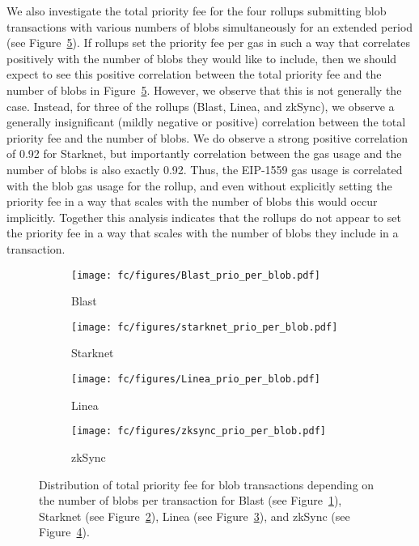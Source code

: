 We also investigate the total priority fee for the four rollups submitting blob transactions with various numbers of blobs simultaneously for an extended period (see Figure~\ref{fig:prio_per_num_blobs}).
If rollups set the priority fee per gas in such a way that correlates positively with the number of blobs they would like to include, then we should expect to see this positive correlation between the total priority fee and the number of blobs in Figure~\ref{fig:prio_per_num_blobs}. However, we observe that this is not generally the case. Instead, for three of the rollups (Blast, Linea, and zkSync), we observe a generally insignificant (mildly negative or positive) correlation between the total priority fee and the number of blobs. We do observe a strong positive correlation of 0.92 for Starknet, but importantly correlation between the gas usage and the number of blobs is also exactly 0.92. Thus, the EIP-1559 gas usage is correlated with the blob gas usage for the rollup, and even without explicitly setting the priority fee in a way that scales with the number of blobs this would occur implicitly. Together this analysis indicates that the rollups do not appear to set the priority fee in a way that scales with the number of blobs they include in a transaction.


\begin{figure}[t]
    \centering
    \begin{subfigure}[t]{0.48\columnwidth}
        \texttt{[image: fc/figures/Blast\_prio\_per\_blob.pdf]}
    \caption{Blast}
    \label{fig:Blast_prio_per_blob}
    \end{subfigure}\hfill
    \begin{subfigure}[t]{0.48\columnwidth}
        \texttt{[image: fc/figures/starknet\_prio\_per\_blob.pdf]}
    \caption{Starknet}
    \label{fig:starknet_prio_per_blob}
    \end{subfigure}    
    \begin{subfigure}[t]{0.48\columnwidth}
        \texttt{[image: fc/figures/Linea\_prio\_per\_blob.pdf]}
    \caption{Linea}
    \label{fig:Linea_prio_per_blob}
    \end{subfigure}\hfill
    \begin{subfigure}[t]{0.48\columnwidth}
        \texttt{[image: fc/figures/zksync\_prio\_per\_blob.pdf]}
    \caption{zkSync}
    \label{fig:zksync_prio_per_blob}
    \end{subfigure}    
    \caption{Distribution of total priority fee for blob transactions depending on the number of blobs per transaction for Blast (see Figure~\ref{fig:Blast_prio_per_blob}), Starknet (see Figure~\ref{fig:starknet_prio_per_blob}), Linea (see Figure~\ref{fig:Linea_prio_per_blob}), and zkSync (see Figure~\ref{fig:zksync_prio_per_blob}). }\label{fig:prio_per_num_blobs}
\end{figure}

